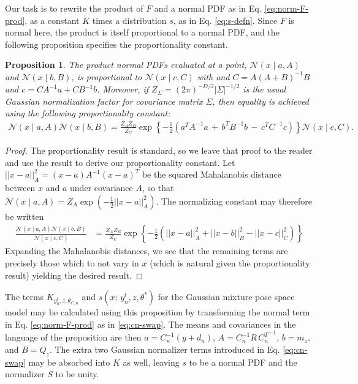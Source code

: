 \documentclass{article}         %
\newtheorem{proposition}{Proposition}[section]
\newcommand{\inv}{^{-1}}
\newcommand{\NN}{\mathcal{N}}
\newcommand{\abs}[1]{\left| #1 \right|}
\newcommand{\norm}[1]{\left|\left| #1 \right|\right|}
\newcommand{\cb}[1]{\left\{ #1 \right\}}
\newcommand{\pn}[1]{\left( #1 \right)}
\begin{document}
Our task is to rewrite the product of $F$ and a normal PDF as in Eq. \ref{eq:norm-F-prod}, as a constant $K$ times a distribution $s$, as in Eq. \ref{eq:s-defn}. Since $F$ is normal here, the product is itself proportional to a normal PDF, and the following proposition specifies the proportionality constant.
\begin{proposition}
    The product normal PDFs evaluated at a point, $\NN(x\mid a, A)$ and $\NN(x\mid b, B)$, is proportional to $ \NN(x\mid c, C)$ with and $C = A\pn{A + B}\inv B$ and $c = CA\inv a + CB\inv b$. Moreover, if $Z_\Sigma = \pn{2\pi}^{-D/2}\abs{\Sigma}^{-1/2}$ is the usual Gaussian normalization factor for covariance matrix $\Sigma$, then equality is achieved using the following proportionality constant:
    \begin{align}
        \NN(x\mid a, A) \NN(x\mid b, B) = \frac{Z_AZ_B}{Z_C} \exp\cb{-\frac{1}{2}\pn{a^TA\inv a \,+\, b^TB\inv b \,-\, c^T C\inv c}} \NN(x\mid c, C).
    \end{align}
\end{proposition}
\begin{proof}
The proportionality result is standard, so we leave that proof to the reader and use the result to derive our proportionality constant. Let $\norm{x-a}^2_A = (x - a)A\inv (x - a)^T$ be the squared Mahalanobis distance between $x$ and $a$ under covariance $A$, so that $\NN(x\mid a, A) = Z_{A}\exp(-\frac{1}{2}\norm{x-a}^2_A)$. The normalizing constant may therefore be written
\begin{align}
    \frac{\NN(x\mid a, A)\NN(x\mid b, B)}{\NN(x\mid c, C)} &= \frac{Z_AZ_B}{Z_C} \exp\cb{-\frac{1}{2}\pn{\norm{x - a}^2_A + \norm{x - b}^2_B - \norm{x - c}^2_C}}
\end{align}
Expanding the Mahalanobis distances, we see that the remaining terms are precisely those which to not vary in $x$ (which is natural given the proportionality result) yielding the desired result.
\end{proof}
The terms $K_{y^t_n, z, \theta_{C, n}}$ and $s(x;\, y^t_n, z, \theta^*)$ for the Gaussian mixture pose space model may be calculated using this proposition by transforming the normal term in Eq. \ref{eq:norm-F-prod} as in \ref{eq:cn-swap}. The means and covariances in the language of the proposition are then $a = C_n\inv (y + d_n)$, $A = C_n\inv R\, {C_n^T}\inv$, $b = m_z$, and $B = Q_z$. The extra two Gaussian normalizer terms introduced in Eq. \ref{eq:cn-swap} may be absorbed into $K$ as well, leaving $s$ to be a normal PDF and the normalizer $S$ to be unity. 
\end{document}

